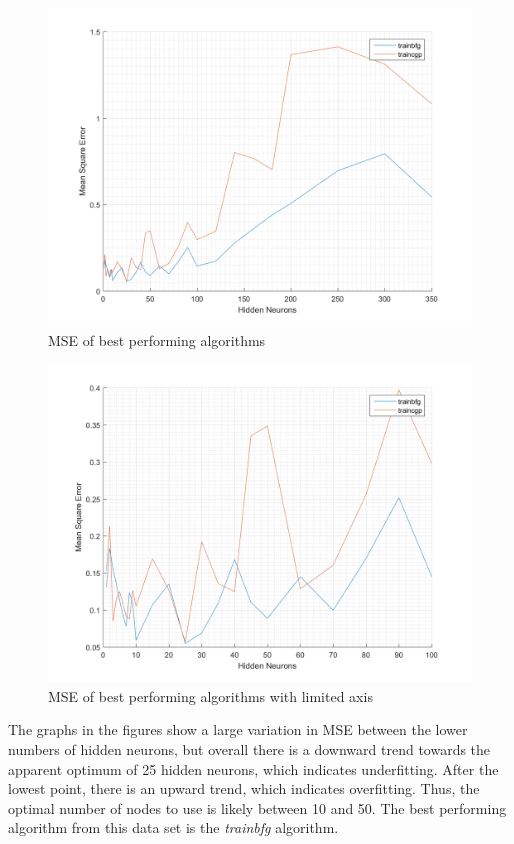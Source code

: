 \documentclass[a4paper, 10pt, conference]{ieeeconf}
\begin{document}
\begin{figure}[!ht]
    \centering
    \includegraphics[width=\linewidth]{pic/unmixed_best_fullrange.png}
    \caption{MSE of best performing algorithms}
    \label{fig:unmixed_full}
\end{figure}

\begin{figure}[!ht]
    \centering
    \includegraphics[width=\linewidth]{pic/unmixed_best_limited.png}
    \caption{MSE of best performing algorithms with limited axis}
    \label{fig:unmixed_limited}
\end{figure}

The graphs in the figures show a large variation in MSE between the lower numbers of hidden neurons, but overall there is a downward trend towards the apparent optimum of 25 hidden neurons, which indicates underfitting. After the lowest point, there is an upward trend, which indicates overfitting. Thus, the optimal number of nodes to use is likely between 10 and 50. The best performing algorithm from this data set is the \textit{trainbfg} algorithm.
\end{document}
